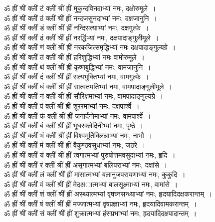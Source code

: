 \documentclass[twoside,top=1.7cm, bottom=1.7cm, outer=1cm,landscape, inner=1.5cm,a5paper,]{book}
\begin{document}
ॐ ह्रीं श्रीं क्लीं टं क्लीं श्रीं ह्रीं मुकुन्दविनदाभ्यां नमः, दक्षोरुमूले~।\\
ॐ ह्रीं श्रीं क्लीं ठं क्लीं श्रीं ह्रीं नन्दजसुनदाभ्यां नमः, दक्षजानुनि~।\\
ॐ ह्रीं श्रीं क्लीं डं क्लीं श्रीं ह्रीं नन्दिसत्याभ्यां नमः, दक्षगुल्फे~।\\
ॐ ह्रीं श्रीं क्लीं ढं क्लीं श्रीं ह्रीं नरर्द्धिभ्यां नमः, दक्षपादाङ्गुलीमूले~।\\
ॐ ह्रीं श्रीं क्लीं णं क्लीं श्रीं ह्रीं नरकजित्समृद्धिभ्यां नमः दक्षपादाङ्गुल्यग्रे~।\\
ॐ ह्रीं श्रीं क्लीं तं क्लीं श्रीं ह्रीं हरिशुद्धिभ्यां नमः वामोरुमूले~।\\
ॐ ह्रीं श्रीं क्लीं थं क्लीं श्रीं ह्रीं कृष्णबुद्धिभ्यां नमः, वामजानुनि~।\\
ॐ ह्रीं श्रीं क्लीं दं क्लीं श्रीं ह्रीं सत्यभुक्तिभ्यां नमः, वामगुल्फे~।\\
ॐ ह्रीं श्रीं क्लीं धं क्लीं श्रीं ह्रीं सात्वतमतिभ्यां नमः, वामपादाङ्गुलीमूले~।\\
ॐ ह्रीं श्रीं क्लीं नं क्लीं श्रीं ह्रीं सौरिक्षमाभ्यां नमः, वामपादाङ्गुल्यग्रे~।\\
ॐ ह्रीं श्रीं क्लीं पं क्लीं श्रीं ह्रीं शूररमाभ्यां नमः, दक्षपार्श्वे~।\\
ॐ ह्रीं श्रीं क्लीं फं क्लीं श्रीं ह्रीं जनार्दनोमाभ्यां नमः, वामपार्श्वे~।\\
ॐ ह्रीं श्रीं क्लीं बं क्लीं श्रीं ह्रीं भूधरक्लेदिनीभ्यां नमः, पृष्ठे~।\\
ॐ ह्रीं श्रीं क्लीं भं क्लीं श्रीं ह्रीं विश्वमूर्तिक्लिन्नाभ्यां नमः, नाभौ~।\\
ॐ ह्रीं श्रीं क्लीं मं क्लीं श्रीं ह्रीं वैकुण्ठवसुधाभ्यां नमः, जठरे~।\\
ॐ ह्रीं श्रीं क्लीं यं क्लीं श्रीं ह्रीं त्वगात्मभ्यां पुरुषोत्तमवसुदाभ्यां नमः, हृदि~।\\
ॐ ह्रीं श्रीं क्लीं रं क्लीं श्रीं ह्रीं असृगात्मभ्यां बलिपराभ्यां नमः, दक्षांसे~।\\
ॐ ह्रीं श्रीं क्लीं लं क्लीं श्रीं ह्रीं मांसात्मभ्यां बलानुजपरायणाभ्यां नमः, कुकुदि~।\\
ॐ ह्रीं श्रीं क्लीं वं क्लीं श्रीं ह्रीं मेदअात्मभ्यां बालसूक्ष्माभ्यां नमः, वामांसे~।\\
ॐ ह्रीं श्रीं क्लीं शं क्लीं श्रीं ह्रीं अस्थ्यात्मभ्यां वृषघ्नसन्ध्याभ्यां नमः, हृदयादिदक्षकरान्तम्~।\\
ॐ ह्रीं श्रीं क्लीं षं क्लीं श्रीं ह्रीं मज्जात्मभ्यां वृषप्रज्ञाभ्यां नमः, हृदयादिवामकरान्तम्~।\\
ॐ ह्रीं श्रीं क्लीं सं क्लीं श्रीं ह्रीं शुक्रात्मभ्यां हंसप्रभाभ्यां नमः, हृदयादिदक्षपादान्तम्~।\\
\end{document}
